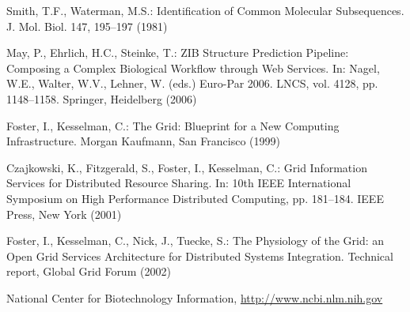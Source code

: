 \documentclass[runningheads,a4paper]{llncs}
\begin{document}
\begin{thebibliography}{4}

 Smith, T.F., Waterman, M.S.: Identification of Common Molecular
Subsequences. J. Mol. Biol. 147, 195--197 (1981)

 May, P., Ehrlich, H.C., Steinke, T.: ZIB Structure Prediction Pipeline:
Composing a Complex Biological Workflow through Web Services. In: Nagel,
W.E., Walter, W.V., Lehner, W. (eds.) Euro-Par 2006. LNCS, vol. 4128,
pp. 1148--1158. Springer, Heidelberg (2006)

 Foster, I., Kesselman, C.: The Grid: Blueprint for a New Computing
Infrastructure. Morgan Kaufmann, San Francisco (1999)

 Czajkowski, K., Fitzgerald, S., Foster, I., Kesselman, C.: Grid
Information Services for Distributed Resource Sharing. In: 10th IEEE
International Symposium on High Performance Distributed Computing, pp.
181--184. IEEE Press, New York (2001)

 Foster, I., Kesselman, C., Nick, J., Tuecke, S.: The Physiology of the
Grid: an Open Grid Services Architecture for Distributed Systems
Integration. Technical report, Global Grid Forum (2002)

 National Center for Biotechnology Information, \url{http://www.ncbi.nlm.nih.gov}

\end{thebibliography}
\end{document}
